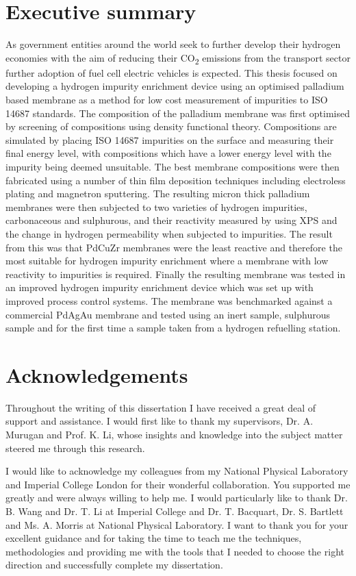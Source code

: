 \documentclass[a4paper,12pt]{report}
\begin{document}
\chapter*{Executive summary}
As government entities around the world seek to further develop their hydrogen economies with the aim of reducing their CO\textsubscript{2} emissions from the transport sector further adoption of fuel cell electric vehicles is expected. This thesis focused on developing a hydrogen impurity enrichment device using an optimised palladium based membrane as a method for low cost measurement of impurities to ISO 14687 standards. The composition of the palladium membrane was first optimised by screening of compositions using density functional theory. Compositions are simulated by placing ISO 14687 impurities on the surface and measuring their final energy level, with compositions which have a lower energy level with the impurity being deemed unsuitable. The best membrane compositions were then fabricated using a number of thin film deposition techniques including electroless plating and magnetron sputtering. The resulting micron thick palladium membranes were then subjected to two varieties of hydrogen impurities, carbonaceous and sulphurous, and  their reactivity measured by using XPS and the change in hydrogen permeability when subjected to impurities. The result from this was that PdCuZr membranes were the least reactive and therefore the most suitable for hydrogen impurity enrichment where a membrane with low reactivity to impurities is required. Finally the resulting membrane was tested in an improved hydrogen impurity enrichment device which was set up with improved process control systems. The membrane was benchmarked against a commercial PdAgAu membrane and tested using an inert sample, sulphurous sample and for the first time a sample taken from a hydrogen refuelling station.

\chapter*{Acknowledgements}
Throughout the writing of this dissertation I have received a great deal of support and assistance. I  would  first  like  to  thank  my  supervisors,  Dr.  A.  Murugan and Prof. K. Li, whose insights and knowledge into the subject matter steered me through this research.

I would like to acknowledge my colleagues from my National Physical Laboratory and Imperial College London for their wonderful collaboration. You supported me greatly and were always willing to help me. I would particularly like to thank Dr. B. Wang and Dr. T. Li at Imperial College and Dr. T. Bacquart, Dr. S. Bartlett and Ms. A. Morris at National Physical Laboratory. I want to thank you for your excellent guidance and  for  taking the time to teach me the techniques, methodologies and providing  me  with  the  tools  that I  needed  to  choose  the  right  direction  and  successfully complete my dissertation.
\end{document}
